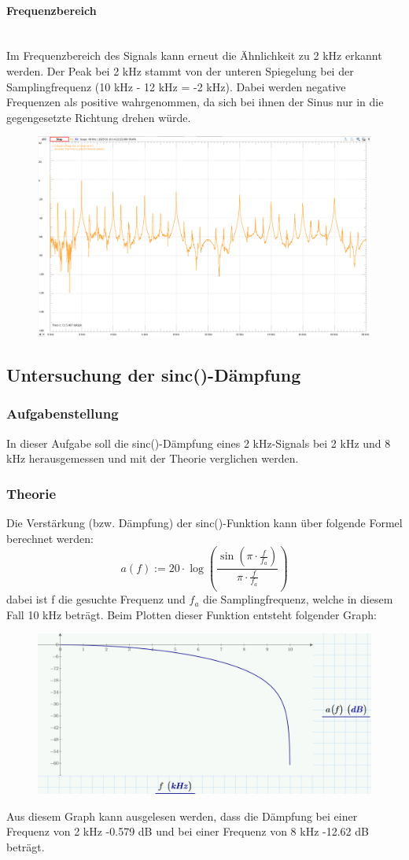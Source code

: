 \documentclass{article}
\begin{document}
\paragraph{Frequenzbereich}\mbox{}\\
Im Frequenzbereich des Signals kann erneut die Ähnlichkeit zu 2 kHz erkannt werden. Der Peak bei 2 kHz stammt von der unteren Spiegelung bei der Samplingfrequenz (10 kHz - 12 kHz = -2 kHz). Dabei werden negative Frequenzen als positive wahrgenommen, da sich bei ihnen der Sinus nur in die gegengesetzte Richtung drehen würde.
\begin{figure}[h]
    \centering
    \includegraphics[width=0.8\linewidth]{img/Freq_08.png}
\end{figure}
\newpage
\subsection{Untersuchung der sinc()-Dämpfung}
\subsubsection{Aufgabenstellung}
In dieser Aufgabe soll die sinc()-Dämpfung eines 2 kHz-Signals bei 2 kHz und 8 kHz herausgemessen und mit der Theorie verglichen werden.

\subsubsection{Theorie}
Die Verstärkung (bzw. Dämpfung) der sinc()-Funktion kann über folgende Formel berechnet werden:
\begin{equation}
  a(f) := 20 \cdot \log \left( \frac{\sin \left( \pi \cdot \frac{f}{f_a} \right)}{\pi \cdot \frac{f}{f_a}} \right)
\end{equation}
dabei ist f die gesuchte Frequenz und $f_a$ die Samplingfrequenz, welche in diesem Fall 10 kHz beträgt. Beim Plotten dieser Funktion entsteht folgender Graph:
\begin{figure}[h]
    \centering
    \includegraphics[width=0.6\linewidth]{img/graph_01.png}
\end{figure}
Aus diesem Graph kann ausgelesen werden, dass die Dämpfung bei einer Frequenz von 2 kHz -0.579 dB und bei einer Frequenz von 8 kHz -12.62 dB beträgt.
\end{document}

